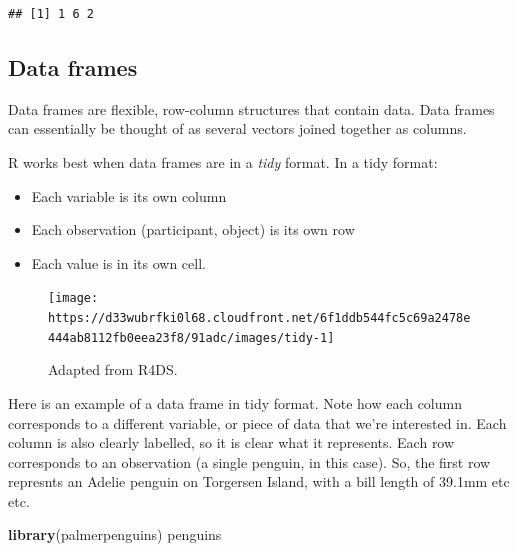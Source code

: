 \documentclass[
]{book}
\newenvironment{Shaded}{\begin{snugshade}}{\end{snugshade}}
\newcommand{\FunctionTok}[1]{\textcolor[rgb]{0.13,0.29,0.53}{\textbf{#1}}}
\newcommand{\NormalTok}[1]{#1}
\providecommand{\tightlist}{%
  \setlength{\itemsep}{0pt}\setlength{\parskip}{0pt}}
\begin{document}
\begin{verbatim}
## [1] 1 6 2
\end{verbatim}

\hypertarget{data-frames}{%
\subsection{Data frames}\label{data-frames}}

Data frames are flexible, row-column structures that contain data. Data frames can essentially be thought of as several vectors joined together as columns.

R works best when data frames are in a \emph{tidy} format. In a tidy format:

\begin{itemize}
\tightlist
\item
  Each variable is its own column
\item
  Each observation (participant, object) is its own row
\item
  Each value is in its own cell.
\end{itemize}

\begin{figure}

{\centering \texttt{[image: https://d33wubrfki0l68.cloudfront.net/6f1ddb544fc5c69a2478e444ab8112fb0eea23f8/91adc/images/tidy-1]} 

}

\caption{Adapted from R4DS.}\label{fig:unnamed-chunk-21}
\end{figure}

Here is an example of a data frame in tidy format. Note how each column corresponds to a different variable, or piece of data that we're interested in. Each column is also clearly labelled, so it is clear what it represents. Each row corresponds to an observation (a single penguin, in this case). So, the first row represnts an Adelie penguin on Torgersen Island, with a bill length of 39.1mm etc etc.

\begin{Shaded}
\begin{Highlighting}[]
\FunctionTok{library}\NormalTok{(palmerpenguins)}
\NormalTok{penguins}
\end{Highlighting}
\end{Shaded}
\end{document}
